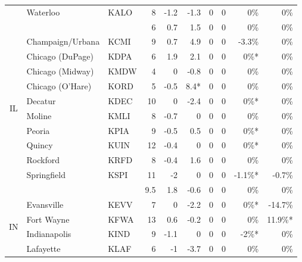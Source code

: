 \documentclass[twocol]{ametsoc}
\begin{document}
\begin{landscape}
\begin{table}[]
\begin{tabular}{cllrrrrrrr}
                     & Waterloo                   & KALO & 8    & -1.2  & -1.3  & 0     & 0    & 0\%     & 0\%      \\ \cline{2-10} 
                     &                            &      & 6    & 0.7   & 1.5   & 0     & 0    & 0\%     & 0\%      \\ \hline
\multirow{10}{*}{IL} & Champaign/Urbana           & KCMI & 9    & 0.7   & 4.9   & 0     & 0    & -3.3\%  & 0\%      \\
                     & Chicago (DuPage)           & KDPA & 6    & 1.9   & 2.1   & 0     & 0    & 0\%*    & 0\%      \\
                     & Chicago (Midway)           & KMDW & 4    & 0     & -0.8  & 0     & 0    & 0\%     & 0\%      \\
                     & Chicago (O'Hare)           & KORD & 5    & -0.5  & 8.4*  & 0     & 0    & 0\%     & 0\%      \\
                     & Decatur                    & KDEC & 10   & 0     & -2.4  & 0     & 0    & 0\%*    & 0\%      \\
                     & Moline                     & KMLI & 8    & -0.7  & 0     & 0     & 0    & 0\%     & 0\%      \\
                     & Peoria                     & KPIA & 9    & -0.5  & 0.5   & 0     & 0    & 0\%*    & 0\%      \\
                     & Quincy                     & KUIN & 12   & -0.4  & 0     & 0     & 0    & 0\%*    & 0\%      \\
                     & Rockford                   & KRFD & 8    & -0.4  & 1.6   & 0     & 0    & 0\%     & 0\%      \\
                     & Springfield                & KSPI & 11   & -2    & 0     & 0     & 0    & -1.1\%* & -0.7\%   \\ \cline{2-10} 
                     &                            &      & 9.5  & 1.8   & -0.6  & 0     & 0    & 0\%     & 0\%      \\ \hline
\multirow{5}{*}{IN}  & Evansville                 & KEVV & 7    & 0     & -2.2  & 0     & 0    & 0\%*    & -14.7\%  \\
                     & Fort Wayne                 & KFWA & 13   & 0.6   & -0.2  & 0     & 0    & 0\%     & 11.9\%*  \\
                     & Indianapolis               & KIND & 9    & -1.1  & 0     & 0     & 0    & -2\%*   & 0\%      \\
                     & Lafayette                  & KLAF & 6    & -1    & -3.7  & 0     & 0    & 0\%     & 0\%      \\

\end{tabular}
\end{table}
\end{landscape}
\end{document}
